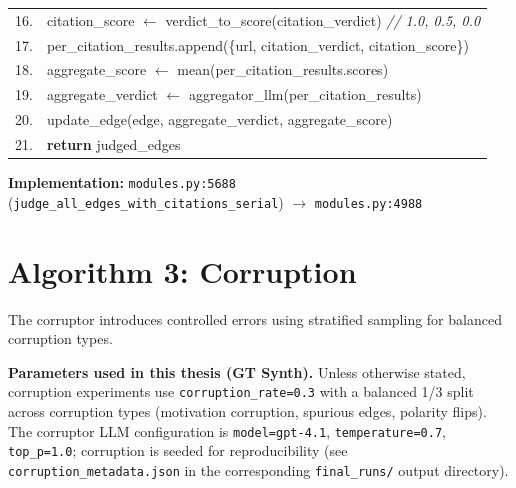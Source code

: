 \begin{table}[H]
\begin{tabular}{@{}r l@{}}
16. & \quad\quad citation\_score $\leftarrow$ verdict\_to\_score(citation\_verdict) \hfill\textit{// 1.0, 0.5, 0.0} \\
17. & \quad\quad per\_citation\_results.append(\{url, citation\_verdict, citation\_score\}) \\
18. & \quad aggregate\_score $\leftarrow$ mean(per\_citation\_results.scores) \\
19. & \quad aggregate\_verdict $\leftarrow$ aggregator\_llm(per\_citation\_results) \\
20. & \quad update\_edge(edge, aggregate\_verdict, aggregate\_score) \\
21. & \textbf{return} judged\_edges \\
\bottomrule
\end{tabular}
\end{table}

\textbf{Implementation:} \texttt{modules.py:5688} (\texttt{judge\_all\_edges\_with\_citations\_serial}) $\rightarrow$ \texttt{modules.py:4988}

\section{Algorithm 3: Corruption}
\label{alg:corruption}

The corruptor introduces controlled errors using stratified sampling for balanced corruption types.

\noindent\textbf{Parameters used in this thesis (GT Synth).} Unless otherwise stated, corruption experiments use \texttt{corruption\_rate=0.3} with a balanced 1/3 split across corruption types (motivation corruption, spurious edges, polarity flips). The corruptor LLM configuration is \texttt{model=gpt-4.1}, \texttt{temperature=0.7}, \texttt{top\_p=1.0}; corruption is seeded for reproducibility (see \texttt{corruption\_metadata.json} in the corresponding \texttt{final\_runs/} output directory).

